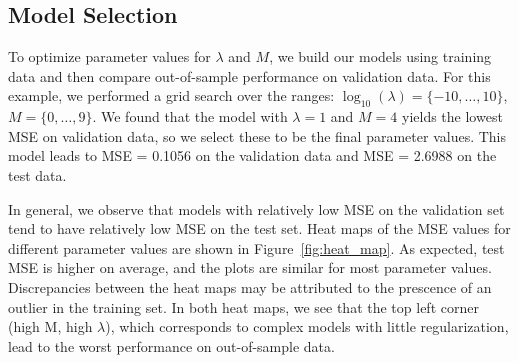 \subsection{Model Selection}
To optimize parameter values for $\lambda$ and $M$, we build our models using training data and then compare out-of-sample performance on validation data.  For this example, we performed a grid search over the ranges: $\log_{10}(\lambda) = \{-10,\ldots,10\}$, $M = \{0,\ldots, 9\}$.  We found that the model with $\lambda = 1$ and $M = 4$ yields the lowest MSE on validation data, so we select these to be the final parameter values.  This model leads to MSE = 0.1056 on the validation data and MSE = 2.6988 on the test data.  

In general, we observe that models with relatively low MSE on the validation set tend to have relatively low MSE on the test set.  Heat maps of the MSE values for different parameter values are shown in Figure~\ref{fig:heat_map}.   As expected, test MSE is higher on average, and the plots are similar for most parameter values.  Discrepancies between the heat maps may be attributed to the prescence of an outlier in the training set.  In both heat maps, we see that the top left corner (high M, high $\lambda$), which corresponds to complex models with little regularization, lead to the worst performance on out-of-sample data.  

